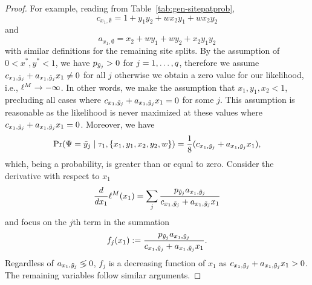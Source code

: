 \begin{proof}
For example, reading from Table~\ref{tab:gen-sitepatprob},
\[
c_{x_1,\emptyset} = 1+y_1y_2+wx_2y_1+wx_2y_2
\]
and
\[
a_{x_1,\emptyset} = x_2+wy_1+wy_2+x_2y_1y_2
\]
with similar definitions for the remaining site splits.
By the assumption of $0 < x^*, y^* < 1$, we have $p_{\tilde{y}_j} > 0$ for $j=1,\ldots,q$, therefore we assume $c_{x_1,\tilde{y}_j} + a_{x_1,\tilde{y}_j}x_1 \neq 0$ for all $j$ otherwise we obtain a zero value for our likelihood, i.e., $\ell^M\rightarrow -\infty$.
In other words, we make the assumption that $x_1,y_1,x_2 < 1$, precluding all cases where $c_{x_1,\tilde{y}_j} + a_{x_1,\tilde{y}_j}x_1 = 0$ for some $j$.
This assumption is reasonable as the likelihood is never maximized at these values where $c_{x_1,\tilde{y}_j} + a_{x_1,\tilde{y}_j}x_1 = 0$.
Moreover, we have
\[
\Pr(\Psi=\tilde{y}_j \mid \tau_1,\{x_1,y_1,x_2,y_2,w\}) = \frac{1}{8} (c_{x_1,\tilde{y}_j} + a_{x_1,\tilde{y}_j}x_1),
\]
which, being a probability, is greater than or equal to zero.
Consider the derivative with respect to $x_1$
\begin{align*}
\frac{d}{dx_1} \ell^M(x_1) = \sum_j \frac{p_{\tilde{y}_j}a_{x_1,\tilde{y}_j}}{c_{x_1,\tilde{y}_j} + a_{x_1,\tilde{y}_j}x_1}
\end{align*}
and focus on the $j$th term in the summation
\[
f_j(x_1) := \frac{p_{\tilde{y}_j}a_{x_1,\tilde{y}_j}}{c_{x_1,\tilde{y}_j} + a_{x_1,\tilde{y}_j}x_1}.
\]
Regardless of $a_{x_1,\tilde{y}_j} \lessgtr 0$, $f_j$ is a decreasing function of $x_1$ as $c_{x_1,\tilde{y}_j} + a_{x_1,\tilde{y}_j}x_1 > 0$.
The remaining variables follow similar arguments.


\end{proof}
